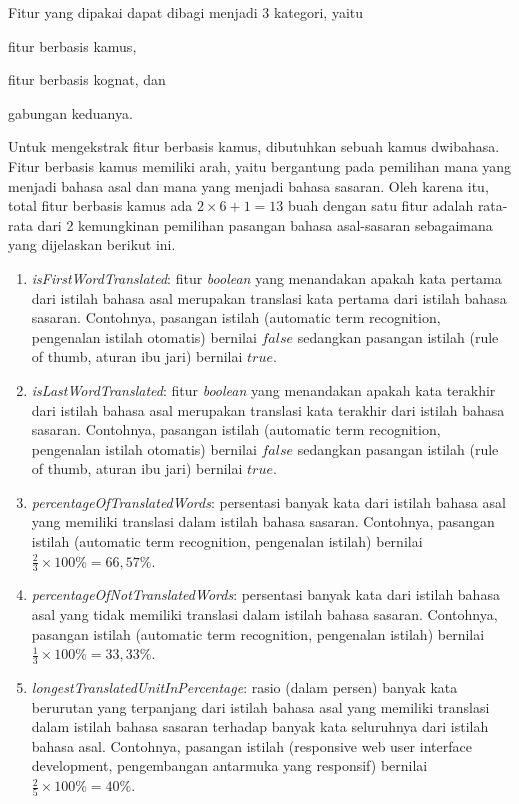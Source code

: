 \documentclass[../main/main.tex]{subfiles}
\begin{document}
Fitur yang dipakai dapat dibagi menjadi 3 kategori, yaitu
\begin{inparaenum}[(1)]
\item fitur berbasis kamus,
\item fitur berbasis kognat, dan
\item gabungan keduanya.
\end{inparaenum}
Untuk mengekstrak fitur berbasis kamus, dibutuhkan sebuah kamus dwibahasa. Fitur berbasis kamus memiliki arah, yaitu bergantung pada pemilihan mana yang menjadi bahasa asal dan mana yang menjadi bahasa sasaran. Oleh karena itu, total fitur berbasis kamus ada $2 \times 6 + 1 = 13$ buah dengan satu fitur adalah rata-rata dari 2 kemungkinan pemilihan pasangan bahasa asal-sasaran sebagaimana yang dijelaskan berikut ini.
\begin{enumerate}
\item \textit{isFirstWordTranslated}: fitur \textit{boolean} yang menandakan apakah kata pertama dari istilah bahasa asal merupakan translasi kata pertama dari istilah bahasa sasaran. Contohnya, pasangan istilah (automatic term recognition, pengenalan istilah otomatis) bernilai $false$ sedangkan pasangan istilah (rule of thumb, aturan ibu jari) bernilai $true$.
\item \textit{isLastWordTranslated}: fitur \textit{boolean} yang menandakan apakah kata terakhir dari istilah bahasa asal merupakan translasi kata terakhir dari istilah bahasa sasaran. Contohnya, pasangan istilah (automatic term recognition, pengenalan istilah otomatis) bernilai $false$ sedangkan pasangan istilah (rule of thumb, aturan ibu jari) bernilai $true$.
\item \textit{percentageOfTranslatedWords}: persentasi banyak kata dari istilah bahasa asal yang memiliki translasi dalam istilah bahasa sasaran. Contohnya, pasangan istilah (automatic term recognition, pengenalan istilah) bernilai $\frac{2}{3} \times 100\% = 66,57\%$.
\item \textit{percentageOfNotTranslatedWords}: persentasi banyak kata dari istilah bahasa asal yang tidak memiliki translasi dalam istilah bahasa sasaran. Contohnya, pasangan istilah (automatic term recognition, pengenalan istilah) bernilai $\frac{1}{3} \times 100\% = 33,33\%$.
\item \textit{longestTranslatedUnitInPercentage}: rasio (dalam persen) banyak kata berurutan yang terpanjang dari istilah bahasa asal yang memiliki translasi dalam istilah bahasa sasaran terhadap banyak kata seluruhnya dari istilah bahasa asal. Contohnya, pasangan istilah (responsive web user interface development, pengembangan antarmuka yang responsif) bernilai $\frac{2}{5} \times 100\% = 40\%$.

\end{enumerate}
\end{document}
